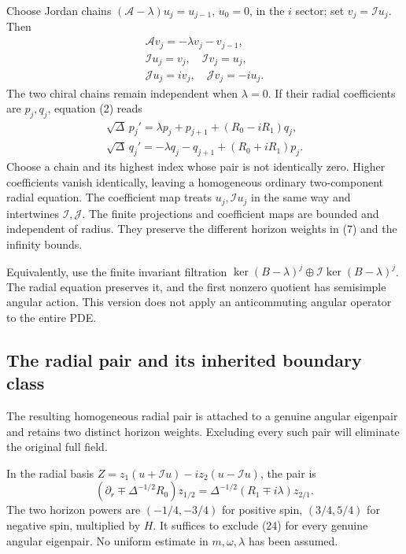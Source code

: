 \documentclass[11pt,a4paper]{article}
\begin{document}
Choose Jordan chains \((\mathcal A-\lambda)u_j=u_{j-1}\), \(u_0=0\), in
the \(i\) sector; set \(v_j=\mathcal Iu_j\). Then \[
 \begin{gathered}\mathcal Av_j=-\lambda v_j-v_{j-1},\\
 \mathcal Iu_j=v_j,\quad \mathcal Iv_j=u_j,\\
 \mathcal Ju_j=iv_j,\quad \mathcal Jv_j=-iu_j .\end{gathered}
 \tag{22}
\] The two chiral chains remain independent when \(\lambda=0\). If their
radial coefficients are \(p_j,q_j\), equation (2) reads \[
 \begin{gathered}\sqrt\Delta\,p_j'=\lambda p_j+p_{j+1}+(R_0-iR_1)q_j,\\
 \sqrt\Delta\,q_j'=-\lambda q_j-q_{j+1}+(R_0+iR_1)p_j .\end{gathered}
 \tag{23}
\] Choose a chain and its highest index whose pair is not identically
zero. Higher coefficients vanish identically, leaving a homogeneous
ordinary two-component radial equation. The coefficient map treats
\(u_j,\mathcal Iu_j\) in the same way and intertwines
\(\mathcal I,\mathcal J\). The finite projections and coefficient maps
are bounded and independent of radius. They preserve the different
horizon weights in (7) and the infinity bounds.

Equivalently, use the finite invariant filtration
\(\ker(B-\lambda)^j\oplus\mathcal I\ker(B-\lambda)^j\). The radial
equation preserves it, and the first nonzero quotient has semisimple
angular action. This version does not apply an anticommuting angular
operator to the entire PDE.

\subsection{The radial pair and its inherited boundary class}\label{readable-radial-pair}

The resulting homogeneous radial pair is attached to a genuine angular eigenpair and retains two distinct horizon weights. Excluding every such pair will eliminate the original full field.

In the radial basis \(Z=z_1(u+\mathcal Iu)-iz_2(u-\mathcal Iu)\), the
pair is \[
 (\partial_r\mp\Delta^{-1/2}R_0)z_{1/2}
 =\Delta^{-1/2}(R_1\mp i\lambda)z_{2/1}.
 \tag{24}
\] The two horizon powers are \((-1/4,-3/4)\) for positive spin,
\((3/4,5/4)\) for negative spin, multiplied by \(H\). It suffices to
exclude (24) for every genuine angular eigenpair. No uniform estimate in
\(m,\omega,\lambda\) has been assumed.
\end{document}
